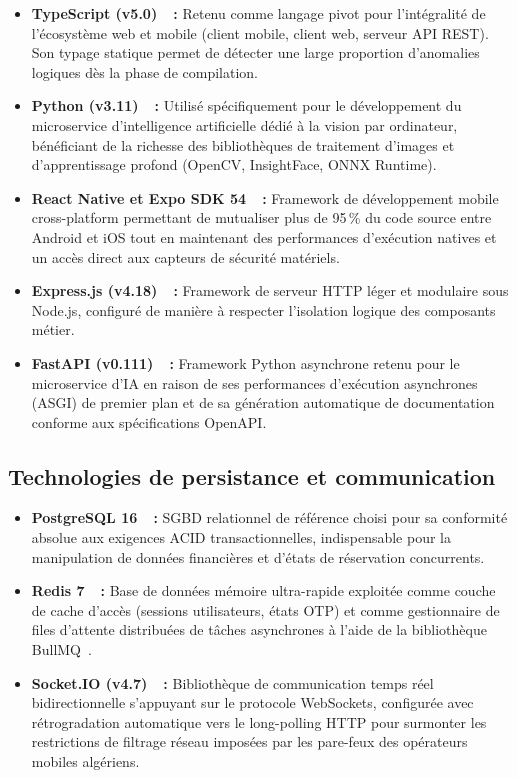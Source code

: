 \begin{itemize}[leftmargin=1.8em]
  \item \textbf{TypeScript (v5.0)~\cite{typescript_docs}~:} Retenu comme langage pivot pour l'intégralité de l'écosystème web et mobile (client mobile, client web, serveur API REST). Son typage statique permet de détecter une large proportion d'anomalies logiques dès la phase de compilation.
  \item \textbf{Python (v3.11)~\cite{python_docs}~:} Utilisé spécifiquement pour le développement du microservice d'intelligence artificielle dédié à la vision par ordinateur, bénéficiant de la richesse des bibliothèques de traitement d'images et d'apprentissage profond (OpenCV, InsightFace, ONNX Runtime).
  \item \textbf{React Native et Expo SDK 54~\cite{reactnative_docs, expo_docs}~:} Framework de développement mobile cross-platform permettant de mutualiser plus de 95\,\% du code source entre Android et iOS tout en maintenant des performances d'exécution natives et un accès direct aux capteurs de sécurité matériels.
  \item \textbf{Express.js (v4.18)~\cite{express_docs}~:} Framework de serveur HTTP léger et modulaire sous Node.js, configuré de manière à respecter l'isolation logique des composants métier.
  \item \textbf{FastAPI (v0.111)~\cite{fastapi_docs}~:} Framework Python asynchrone retenu pour le microservice d'IA en raison de ses performances d'exécution asynchrones (ASGI) de premier plan et de sa génération automatique de documentation conforme aux spécifications OpenAPI.
\end{itemize}

\subsection{Technologies de persistance et communication}

\begin{itemize}[leftmargin=1.8em]
  \item \textbf{PostgreSQL 16~\cite{postgres_docs}~:} SGBD relationnel de référence choisi pour sa conformité absolue aux exigences ACID transactionnelles, indispensable pour la manipulation de données financières et d'états de réservation concurrents.
  \item \textbf{Redis 7~\cite{redis_docs}~:} Base de données mémoire ultra-rapide exploitée comme couche de cache d'accès (sessions utilisateurs, états OTP) et comme gestionnaire de files d'attente distribuées de tâches asynchrones à l'aide de la bibliothèque BullMQ~\cite{bullmq_docs}.
  \item \textbf{Socket.IO (v4.7)~\cite{socketio_docs}~:} Bibliothèque de communication temps réel bidirectionnelle s'appuyant sur le protocole WebSockets, configurée avec rétrogradation automatique vers le long-polling HTTP pour surmonter les restrictions de filtrage réseau imposées par les pare-feux des opérateurs mobiles algériens.
\end{itemize}

